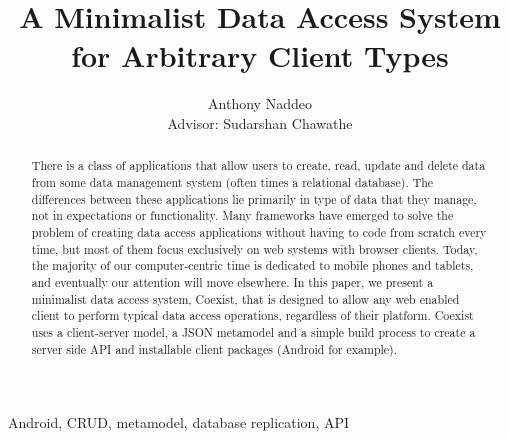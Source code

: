 \documentclass[journal]{IEEEtran}
\begin{document}
\title{A Minimalist Data Access System for Arbitrary Client Types} 
\author{Anthony Naddeo \\ Advisor: Sudarshan Chawathe}

\maketitle


\begin{abstract}
There is a class of applications that allow users to create, read, update and
delete data from some data management system (often times a relational
database). The differences between these applications lie primarily in type of
data that they manage, not in expectations or functionality. Many frameworks
have emerged to solve the problem of creating data access applications without
having to code from scratch every time, but most of them focus exclusively on
web systems with browser clients. Today, the majority of our computer-centric
time is dedicated to mobile phones and tablets, and eventually our attention
will move elsewhere. In this paper, we present a minimalist data access system,
Coexist, that is designed to allow any web enabled client to perform typical
data access operations, regardless of their platform. Coexist uses a
client-server model, a JSON metamodel and a simple build process to create
a server side API and installable client packages (Android for example).
\end{abstract}


\begin{IEEEkeywords}
Android, CRUD, metamodel, database replication, API
\end{IEEEkeywords}

\IEEEpeerreviewmaketitle
\tableofcontents































\end{document}
